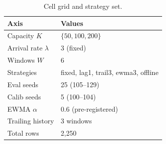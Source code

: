 \begin{table}[!t]
  \caption{Cell grid and strategy set.}
  \label{tab:grid}
  \centering
  \small
  \setlength{\tabcolsep}{4pt}
  \begin{tabular}{@{}p{2.6cm}p{4.9cm}@{}}
    \toprule
    \textbf{Axis} & \textbf{Values} \\
    \midrule
    Capacity $K$ & $\{50, 100, 200\}$ \\
    Arrival rate $\lambda$ & 3 (fixed) \\
    Windows $W$ & 6 \\
    Strategies & fixed, lag1, trail3, ewma3, offline \\
    Eval seeds & 25 (105--129) \\
    Calib seeds & 5 (100--104) \\
    EWMA $\alpha$ & 0.6 (pre-registered) \\
    Trailing history & 3 windows \\
    \midrule
    Total rows & 2{,}250 \\
    \bottomrule
  \end{tabular}
\end{table}
